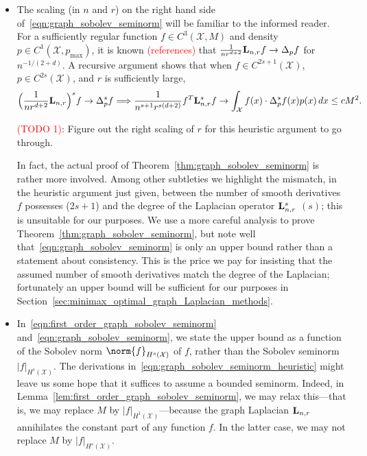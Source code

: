 \documentclass{article}
\newcommand{\1}{\mathbf{1}}
\newcommand{\Lap}{{\bf L}}
\newcommand{\Xset}{\mathcal{X}}
\theoremstyle{alden}
\theoremstyle{aldenthm}
\theoremstyle{definition}
\theoremstyle{remark}
\begin{document}
\begin{itemize}
	\item 
	The scaling (in $n$ and $r$) on the right hand side of~\eqref{eqn:graph_sobolev_seminorm} will be familiar to the informed reader. For a sufficiently regular function $f \in C^3(\Xset,M)$ and density $p \in C^1(\Xset,p_{\max})$, it is known \textcolor{red}{(references)} that $\frac{1}{nr^{d + 2}}\Lap_{n,r}f \to \Delta_pf$ for $n^{-1/(2 + d)}$. A recursive argument shows that when $f \in C^{2s + 1}(\Xset)$, $p \in C^{2s}(\Xset)$, and $r$ is sufficiently large,
	\begin{equation}
	\label{eqn:graph_sobolev_seminorm_heuristic}
	\Bigl(\frac{1}{nr^{d + 2}}\Lap_{n,r}\Bigr)^s f \to \Delta_p^sf \Longrightarrow \frac{1}{n^{s + 1} r^{s(d + 2)}} f^T \Lap_{n,r}^s f \to \int_{\Xset} f(x) \cdot  \Delta_p^sf(x) p(x) \,dx \leq c M^2.
	\end{equation}
	
	\textcolor{red}{(TODO 1)}: Figure out the right scaling of $r$ for this heuristic argument to go through.
	
	In fact, the actual proof of Theorem~\ref{thm:graph_sobolev_seminorm} is rather more involved. Among other subtleties we highlight the mismatch, in the heuristic argument just given, between the number of smooth derivatives $f$ possesses ($2s + 1$) and the degree of the Laplacian operator $\Lap_{{n,r}}^s$ $(s)$; this is unsuitable for our purposes. We use a more careful analysis to prove Theorem~\eqref{thm:graph_sobolev_seminorm}, but note well that~\eqref{eqn:graph_sobolev_seminorm} is only an upper bound rather than a statement about consistency. This is the price we pay for insisting that the assumed number of smooth derivatives match the degree of the Laplacian; fortunately an upper bound will be sufficient for our purposes in Section~\ref{sec:minimax_optimal_graph_Laplacian_methods}.
	
	\item In~\eqref{eqn:first_order_graph_sobolev_seminorm} and~\eqref{eqn:graph_sobolev_seminorm}, we state the upper bound as a function of the Sobolev norm $\norm{f}_{H^s(\Xset)}$ of $f$, rather than the Sobolev seminorm $|f|_{H^s(\Xset)}$. The derivations in~\eqref{eqn:graph_sobolev_seminorm_heuristic} might leave us some hope that it suffices to assume a bounded seminorm. Indeed, in Lemma~\ref{lem:first_order_graph_sobolev_seminorm}, we may relax this---that is, we may replace $M$ by $|f|_{H^1(\Xset)}$---because the graph Laplacian $\Lap_{n,r}$ annihilates the constant part of any function $f$. In the latter case, we may not replace $M$ by $|f|_{H^s(\Xset)}$. 
	

\end{itemize}
\end{document}
